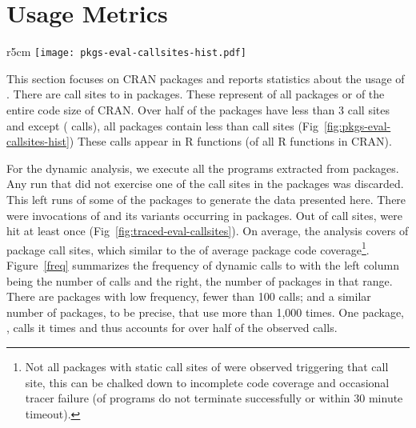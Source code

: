 \documentclass[screen,acmsmall]{acmart}
\begin{document}
\newpage

\section{Usage Metrics}

\begin{wrapfigure}{r}{5cm} \hspace*{-12mm}
  \centering
  \texttt{[image: pkgs-eval-callsites-hist.pdf]} \caption{CRAN
  \eval call sites}%
  \label{fig:pkgs-eval-callsites-hist}
\end{wrapfigure}
%
This section focuses on CRAN packages and reports statistics about the usage of
\eval. There are \PkgEvalCallSites call sites to \eval in \PkgPackages
packages.  These represent \PkgPackagesRatio of all packages or \PkgCodeRatio
of the entire code size of CRAN. Over half of the packages have less than 3
\eval call sites and except \MaxEvalCallSitesPackage (\MaxEvalCallSitesCount
\eval calls), all packages contain less than \MaxEvalCallSitesRest \eval call
sites (\cf Fig~\ref{fig:pkgs-eval-callsites-hist}) These \eval calls appear in
\PkgFunsWithEval R functions (\CranFunsWithEvalRatio of all R functions in
CRAN).

For the dynamic analysis, we execute all the \CranRunnableScripts programs
extracted from \CranPackages packages. Any run that did not exercise one of the
\eval call sites in the packages was discarded. This left \packageNbruns runs of some
of the \packageCorpus packages to generate the data presented here. There were
\packageAllcalls invocations of \eval and its variants occurring in \packageTriggeredpkgs
packages. Out of \PkgEvalCallSitesRnd \eval call sites, \PkgHitEvalCallSites
were hit at least once (\cf Fig~\ref{fig:traced-eval-callsites}). On average,
the analysis covers \PkgHitEvalCallSitesAvgRatio of package \eval call sites,
which similar to the \PkgCodeCoverage of average package code
coverage\footnote{Not all packages with static call sites of \eval were
observed triggering that call site, this can be chalked down to incomplete code
coverage and occasional tracer failure (\PkgFailedProgramsRatio of programs do
not terminate successfully or within 30 minute timeout).}.  Figure~\ref{freq}
summarizes the frequency of dynamic calls to \eval with the left column being
the number of calls and the right, the number of packages in that range. There
are \packageFewcalls packages with low \eval frequency, fewer than 100 calls; and a
similar number of packages, \packageManycalls to be precise, that use \eval more than
1,000 times.  One package, \packageMaxcallspack, calls it \packageMaxcalls times and thus
accounts for over half of the observed calls.
\end{document}
